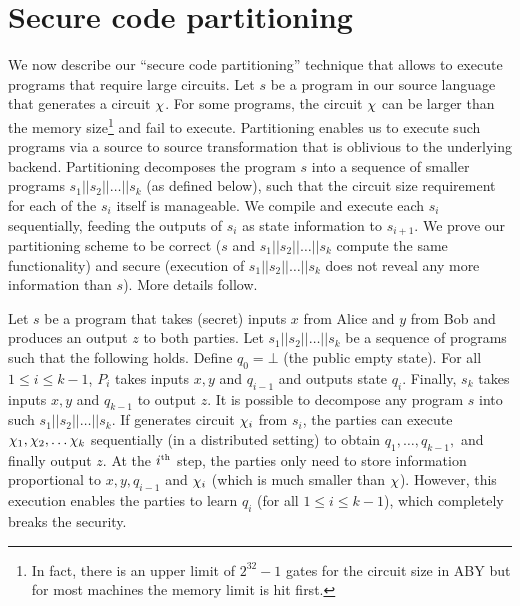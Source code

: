 \section{Secure code partitioning}
\label{sec:pipe}

\newcommand{\prog}{s}
\newcommand{\progn}{t}
\newcommand{\seq}{||}
\newcommand{\state}{q}

We  now describe our ``secure code partitioning'' technique that
allows \tool to execute programs that require large circuits.
Let $\prog$ be a program in our source language that
generates a circuit $\chi$. For some programs, the circuit $\chi$
can be larger than
the memory size\footnote{In fact, there is
  an upper limit of $2^{32}-1$ gates for the circuit size in ABY but
  for most machines the memory limit is hit first.} and fail to
execute. Partitioning enables us to 
execute such programs via a source to source transformation that is
oblivious to the underlying \mpc backend. Partitioning decomposes the
program $\prog$ into a sequence of smaller \tool programs
$\prog_1\seq\prog_2\seq\dots\seq\prog_k$ (as defined below), such
that the circuit size
requirement for each of the $\prog_i$ itself is manageable. We compile
and execute each $\prog_i$ sequentially, feeding the outputs of
$\prog_i$ as state
information to $\prog_{i+1}$. We prove our partitioning scheme to be
correct ($\prog$ and $\prog_1\seq\prog_2\seq\dots\seq\prog_k$ compute
the same functionality) and secure (execution of
$\prog_1\seq\prog_2\seq\dots\seq\prog_k$ does
not reveal any more information than $s$). More details follow.

Let $\prog$ be a program that takes (secret) inputs $x$ from Alice and
$y$ from Bob and produces an output $z$ to both parties. Let
$\prog_1\seq\prog_2\seq\dots\seq\prog_k$ be a sequence of programs
such that the following holds. Define $\state_0 = \bot$ (the public empty
state). For all
$1\leq i\leq k-1$, $P_i$ takes inputs $x, y$ and $\state_{i-1}$ and
outputs state $\state_i$. Finally, $\prog_k$ takes inputs $x, y$ and
$\state_{k-1}$ to  output $z$. It is
possible to decompose any program $\prog$  into such
$\prog_1\seq\prog_2\seq\dots\seq\prog_k$. If \tool generates circuit
$\chi_i$ from
$\prog_i$, the parties can execute
$\chi_1, \chi_2, \dots \chi_k$
sequentially (in a distributed setting)  to obtain
$\state_1,\dots,\state_{k-1},$ and finally output $z$. At the
$i^{\textrm{\tiny{th}}}$ step, the parties only need to store
information proportional to $x,y,\state_{i-1}$ and $\chi_i$ (which is
much smaller than $\chi$). However, this execution enables the
parties to learn $\state_i$ (for all $1\leq i\leq k-1$), which
completely breaks the security.

